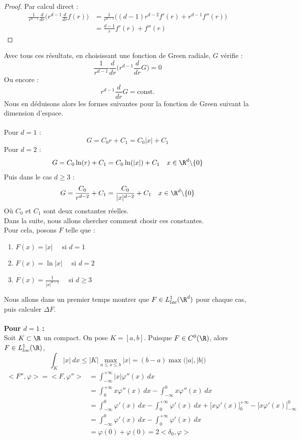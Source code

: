 \begin{proof} Par calcul direct : 
    \begin{align*}
        \frac{1}{r^{d-1}}\frac{d}{dr}\bigg(r^{d-1} \frac{d}{dr} f(r) \bigg) &= \frac{1}{r^{d-1}} \bigg( (d-1)r^{d-2} f'(r) + r^{d-1}f''(r) \bigg) \\
        &= \frac{d-1}{r}f'(r) + f''(r)
    \end{align*}
\end{proof}
Avec tous ces résultats, en choisissant une fonction de Green radiale, $G$ vérifie :
$$ \frac{1}{r^{d-1}} \frac{d}{dr}\Big(r^{d-1} \frac{d}{dr} G\Big) = 0 $$
Ou encore :
$$ r^{d-1} \frac{d}{dr} G  = \text{const.} $$
Nous en déduisons alors les formes suivantes pour la fonction de Green suivant la dimension d'espace.\\
\\
Pour $d = 1$ : 
$$ G = C_0r + C_1 = C_0|x| + C_1 $$
Pour $d = 2$ :
$$ G = C_0\ln(r) + C_1 = C_0 \ln(|x|) + C_1 \quad x \in \R^d \backslash \{0\} $$
Puis dans le cas $d \geq 3$ :
$$ G = \frac{C_0}{r^{d-2}} + C_1 = \frac{C_0}{|x|^{d-2}} + C_1 \quad x \in \R^d \backslash \{0\} $$
Où $C_0$ et $C_1$ sont deux constantes réelles. \\
Dans la suite, nous allons chercher comment chosir ces constantes.\\
Pour cela, posons $F$ telle que :
\begin{enumerate}
    \item $F(x) = |x| \quad $ si $d=1$ \\
    \item $F(x) = \ln|x| \quad$ si $d=2$ \\
    \item $F(x) = \frac{1}{|x|^{d-2}} \quad $ si $d \geq 3$
\end{enumerate}
Nous allons dans un premier temps montrer que $F \in L^1_{loc}(\R^d)$ pour chaque cas, puis calculer 
$\Delta F$.\\
\\
\textbf{Pour $d = 1$ :}\\
Soit $K \subset \R$ un compact. On pose $K = [a,b]$.
Puisque $F \in C^0(\R)$, alors $F \in L^1_{loc}(\R)$,
$$\int_{K} |x| \ dx \leq  \big| K \big| \underset{a \leq x \leq b}{\max}|x| = (b-a) \max\big(|a|,|b|\big) $$
\begin{align*}
    \big< F'',\varphi \big> = \big< F,\varphi'' \big> &= \int_{-\infty}^{+\infty} |x|\varphi''(x) \ dx \\
    &= \int_{0}^{+\infty} x\varphi''(x) \ dx - \int_{-\infty}^0 x\varphi''(x) \ dx \\
    &= \int_{-\infty}^{0} \varphi'(x) \ dx - \int_{0}^{+\infty} \varphi'(x) \ dx + \Big[ x\varphi'(x) \Big]_{0}^{+\infty} - \Big[ x\varphi'(x) \Big]_{-\infty}^{0} \\
    &= \int_{-\infty}^{0} \varphi'(x) \ dx - \int_{0}^{+\infty} \varphi'(x) \ dx \\
    &= \varphi(0) + \varphi(0) = 2\big< \delta_0, \varphi \big>
\end{align*}
